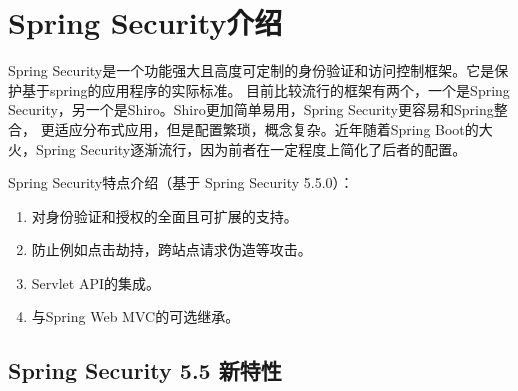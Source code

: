 \section{Spring Security介绍}

Spring Security是一个功能强大且高度可定制的身份验证和访问控制框架。它是保护基于spring的应用程序的实际标准。
目前比较流行的框架有两个，一个是Spring Security，另一个是Shiro。Shiro更加简单易用，Spring Security更容易和Spring整合，
更适应分布式应用，但是配置繁琐，概念复杂。近年随着Spring Boot的大火，Spring Security逐渐流行，因为前者在一定程度上简化了后者的配置。

Spring Security特点介绍（基于 Spring Security 5.5.0）：
\begin{enumerate}
  \item 对身份验证和授权的全面且可扩展的支持。
  \item 防止例如点击劫持，跨站点请求伪造等攻击。
  \item Servlet API的集成。
  \item 与Spring Web MVC的可选继承。
\end{enumerate}

\subsection{Spring Security 5.5 新特性}

